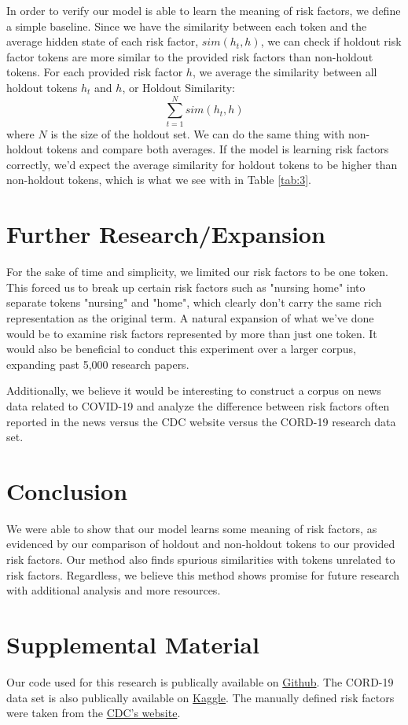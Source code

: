 \documentclass[11pt,a4paper]{article}
\begin{document}
In order to verify our model is able to learn the meaning of risk factors, we define a simple baseline. Since we have the similarity between each token and the average hidden state of each risk factor, $sim(h_t, h)$, we can check if holdout risk factor tokens are more similar to the provided risk factors than non-holdout tokens. For each provided risk factor $h$, we average the similarity between all holdout tokens $h_t$ and $h$, or Holdout Similarity:  $$\sum_{t=1}^{N} sim(h_t, h)$$
where $N$ is the size of the holdout set. We can do the same thing with non-holdout tokens and compare both averages. If the model is learning risk factors correctly, we'd expect the average similarity for holdout tokens to be higher than non-holdout tokens, which is what we see with in Table \ref{tab:3}. 

\section{Further Research/Expansion}
For the sake of time and simplicity, we limited our risk factors to be one token. This forced us to break up certain risk factors such as "nursing home" into separate tokens "nursing" and "home", which clearly don't carry the same rich representation as the original term. A natural expansion of what we've done would be to examine risk factors represented by more than just one token. It would also be beneficial to conduct this experiment over a larger corpus, expanding past 5,000 research papers. 

Additionally, we believe it would be interesting to construct a corpus on news data related to COVID-19 and analyze the difference between risk factors often reported in the news versus the CDC website versus the CORD-19 research data set.

\section{Conclusion}
We were able to show that our model learns some meaning of risk factors, as evidenced by our comparison of holdout and non-holdout tokens to our provided risk factors. Our method also finds spurious similarities with tokens unrelated to risk factors. Regardless, we believe this method shows promise for future research with additional analysis and more resources.

\label{e ssriskec: aact fcceiesss as thibility}




\appendix

\section{Supplemental Material}
Our code used for this research is publically available on \href{https://github.com/blainerothrock/cord19-risk-factors}{Github}. The CORD-19 data set is also publically available on \href{https://www.kaggle.com/allen-institute-for-ai/CORD-19-research-challenge/}{Kaggle}. The manually 
defined risk factors were taken from the \href{https://www.cdc.gov/coronavirus/2019-ncov/need-extra-precautions/people-at-higher-risk.html}{CDC's website}.
\label{sec:supplemental}
\end{document}
